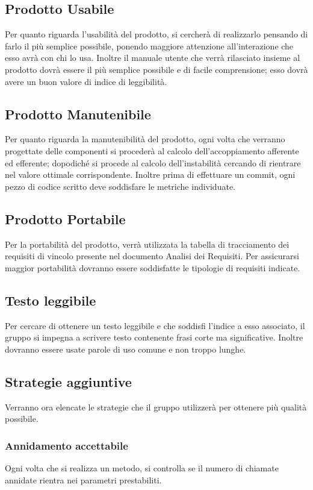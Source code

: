 \subsection{Prodotto Usabile}
Per quanto riguarda l'usabilità del prodotto, si cercherà di realizzarlo pensando di farlo il più semplice possibile, ponendo maggiore attenzione all'interazione che esso avrà con chi lo usa. Inoltre il manuale utente che verrà rilasciato insieme al prodotto dovrà essere il più semplice possibile e di facile comprensione; esso dovrà avere un buon valore di indice di leggibilità.

\subsection{Prodotto Manutenibile}
Per quanto riguarda la manutenibilità del prodotto, ogni volta che verranno progettate delle componenti si procederà al calcolo dell'accoppiamento afferente ed efferente; dopodiché si procede al calcolo dell'instabilità cercando di rientrare nel valore ottimale corrispondente. Inoltre prima di effettuare un commit, ogni pezzo di codice scritto deve soddisfare le metriche individuate.

\subsection{Prodotto Portabile}
Per la portabilità del prodotto, verrà utilizzata la tabella di tracciamento dei requisiti di vincolo presente nel documento Analisi dei Requisiti. Per assicurarsi maggior portabilità dovranno essere soddisfatte le tipologie di requisiti indicate.

\subsection{Testo leggibile}
Per cercare di ottenere un testo leggibile e che soddisfi l'indice a esso associato, il gruppo si impegna a scrivere testo contenente frasi corte ma significative. Inoltre dovranno essere usate parole di uso comune e non troppo lunghe.

\subsection{Strategie aggiuntive}
Verranno ora elencate le strategie che il gruppo utilizzerà per ottenere più qualità possibile.

\subsubsection{Annidamento accettabile}
Ogni volta che si realizza un metodo, si controlla se il numero di chiamate annidate rientra nei parametri prestabiliti.

